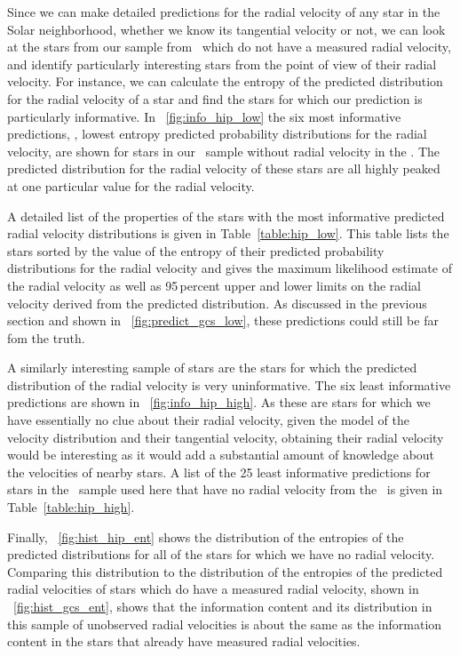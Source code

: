 Since we can make detailed predictions for the radial velocity of any
star in the Solar neighborhood, whether we know its tangential
velocity or not, we can look at the stars from our sample from
\Hipparcos\ which do not have a measured radial velocity, and identify
particularly interesting stars from the point of view of their radial
velocity. For instance, we can calculate the entropy of the predicted
distribution for the radial velocity of a star and find the stars for
which our prediction is particularly informative. In
\figurename~\ref{fig:info_hip_low} the six most informative
predictions, \ie, lowest entropy predicted probability distributions
for the radial velocity, are shown for stars in our \Hipparcos\ sample
without radial velocity in the \gcsabb. The predicted distribution for
the radial velocity of these stars are all highly peaked at one
particular value for the radial velocity.

A detailed list of the properties of the stars with the most
informative predicted radial velocity distributions is given in
Table~\ref{table:hip_low}. This table lists the stars sorted by the
value of the entropy of their predicted probability distributions for
the radial velocity and gives the maximum likelihood estimate of the
radial velocity as well as 95\,percent upper and lower limits on the
radial velocity derived from the predicted distribution. As discussed
in the previous section and shown in
\figurename~\ref{fig:predict_gcs_low}, these predictions could still be
far fom the truth. 

A similarly interesting sample of stars are the stars for which the
predicted distribution of the radial velocity is very
uninformative. The six least informative predictions are shown in
\figurename~\ref{fig:info_hip_high}. As these are stars for which we
have essentially no clue about their radial velocity, given the model
of the velocity distribution and their tangential velocity, obtaining
their radial velocity would be interesting as it would add a
substantial amount of knowledge about the velocities of nearby
stars. A list of the 25 least informative predictions for stars in the
\Hipparcos\ sample used here that have no radial velocity from the
\gcsabb\ is given in Table~\ref{table:hip_high}.

Finally, \figurename~\ref{fig:hist_hip_ent} shows the distribution of
the entropies of the predicted distributions for all of the stars for
which we have no radial velocity. Comparing this distribution to the
distribution of the entropies of the predicted radial velocities of
stars which do have a measured radial velocity, shown in
\figurename~\ref{fig:hist_gcs_ent}, shows that the information content
and its distribution in this sample of unobserved radial velocities is
about the same as the information content in the stars that already
have measured radial velocities.


